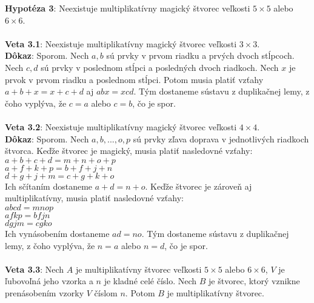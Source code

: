 \documentclass[12pt]{article}
\begin{document}
\textbf{Hypotéza 3}: Neexistuje multiplikatívny magický štvorec veľkosti $5 \times 5$ alebo $6 \times 6$. \\\\

\textbf{Veta 3.1}: Neexistuje multiplikatívny magický štvorec veľkosti $3 \times 3$. \\

\textbf{Dôkaz}: Sporom. Nech $a,b$ sú prvky v prvom riadku a prvých dvoch stĺpcoch. Nech $c,d$ sú prvky v poslednom stĺpci a posledných dvoch riadkoch. Nech $x$ je prvok v prvom riadku a poslednom stĺpci. Potom musia platiť vzťahy $a + b + x = x + c + d$ aj $abx = xcd$. Tým dostaneme sústavu z duplikačnej lemy, z čoho vyplýva, že $c = a$ alebo $c = b$, čo je spor.  \\\\

\textbf{Veta 3.2}: Neexistuje multiplikatívny magický štvorec veľkosti $4 \times 4$. \\

\textbf{Dôkaz}: Sporom. Nech $a, b, ... , o, p$ sú prvky zľava doprava v jednotlivých riadkoch štvorca. Keďže štvorec je magický, musia platiť nasledovné vzťahy: \\
$a + b + c + d = m + n + o + p$ \\
$a + f + k + p = b + f + j + n$ \\
$d + g + j + m = c + g + k + o$ \\

Ich sčítaním dostaneme $a + d = n + o$. Keďže štvorec je zároveň aj multiplikatívny, musia platiť nasledovné vzťahy: \\
$abcd = mnop$ \\
$afkp = bfjn$ \\
$dgjm = cgko$ \\

Ich vynásobením dostaneme $ad = no$. Tým dostaneme sústavu z duplikačnej lemy, z čoho vyplýva, že $n = a$ alebo $n = d$, čo je spor. \\\\

\textbf{Veta 3.3}: Nech $A$ je multiplikatívny štvorec veľkosti $5 \times 5$ alebo $6 \times 6$, $V$ je ľubovoľná jeho vzorka a $n$ je kladné celé číslo. Nech $B$ je štvorec, ktorý vznikne prenásobením vzorky $V$ číslom $n$. Potom $B$ je multiplikatívny štvorec. \\
\end{document}
